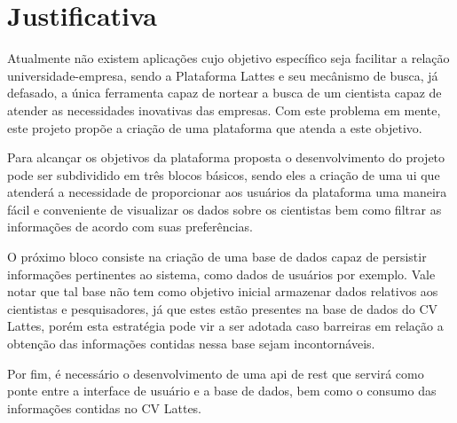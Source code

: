 \section{Justificativa}\label{sec:justificativa}

Atualmente não existem aplicações cujo objetivo específico seja facilitar a relação universidade-empresa, sendo a Plataforma Lattes e seu mecânismo de busca, já defasado, a única ferramenta capaz de nortear a busca de um cientista capaz de atender as necessidades inovativas das empresas. Com este problema em mente, este projeto propõe a criação de uma plataforma que atenda a este objetivo.

Para alcançar os objetivos da plataforma proposta o desenvolvimento do projeto pode ser subdividido em três blocos básicos, sendo eles a criação de uma \gls{ui} que atenderá a necessidade de proporcionar aos usuários da plataforma uma maneira fácil e conveniente de visualizar os dados sobre os cientistas bem como filtrar as informações de acordo com suas preferências.

O próximo bloco consiste na criação de uma base de dados capaz de persistir informações pertinentes ao sistema, como dados de usuários por exemplo. Vale notar que tal base não tem como objetivo inicial armazenar dados relativos aos cientistas e pesquisadores, já que estes estão presentes na base de dados do CV Lattes, porém esta estratégia pode vir a ser adotada caso barreiras em relação a obtenção das informações contidas nessa base sejam incontornáveis. 

Por fim, é necessário o desenvolvimento de uma \gls{api} de \gls{rest} que servirá como ponte entre a interface de usuário e a base de dados, bem como o consumo das informações contidas no CV Lattes.



